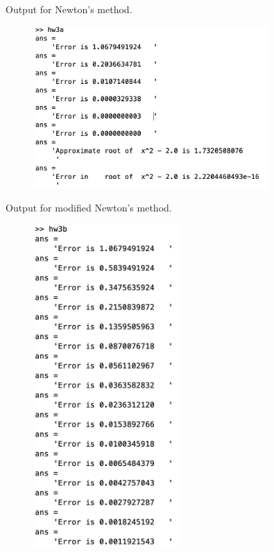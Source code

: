 \documentclass[newpage]{homework}
\begin{document}
\maketitle

\question
Output for Newton's method.
\begin{figure}[htbp]
	\centering
	\includegraphics[width=0.8\textwidth]{3a.png}
\end{figure}

\question
Output for modified Newton's method.
\begin{figure}[htbp]
	\centering
	\includegraphics[width=0.5\textwidth]{3bi.png}
\end{figure}
\end{document}
